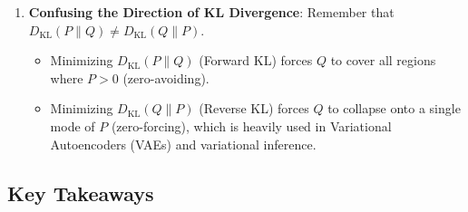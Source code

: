 \begin{warning}
\begin{enumerate}
    \item \textbf{Confusing the Direction of KL Divergence}:
    Remember that $D_{\text{KL}}(P \parallel Q) \ne D_{\text{KL}}(Q \parallel P)$. 
    \begin{itemize}
        \item Minimizing $D_{\text{KL}}(P \parallel Q)$ (Forward KL) forces $Q$ to cover all regions where $P > 0$ (zero-avoiding).
        \item Minimizing $D_{\text{KL}}(Q \parallel P)$ (Reverse KL) forces $Q$ to collapse onto a single mode of $P$ (zero-forcing), which is heavily used in Variational Autoencoders (VAEs) and variational inference.
    \end{itemize}
\end{enumerate}
\end{warning}

\subsection{Key Takeaways}\label{subsec:opt_takeaways}

